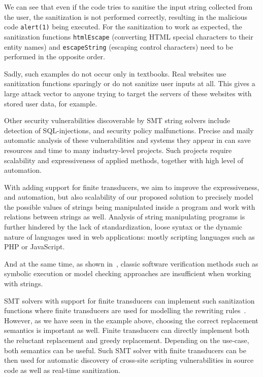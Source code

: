 We can see that even if the code tries to sanitise the input string collected from the user, the sanitization is not performed correctly, resulting in the malicious code \texttt{alert(1)} being executed.
For the sanitization to work as expected, the sanitization functions \texttt{htmlEscape} (converting HTML special characters to their entity names) and \texttt{escapeString} (escaping control characters) need to be performed in the opposite order.

Sadly, such examples do not occur only in textbooks. Real websites use sanitization functions sparingly or do not sanitize user inputs at all.
This gives a large attack vector to anyone trying to target the servers of these websites with stored user data, for example.

Other security vulnerabilities discoverable by SMT string solvers include detection of SQL-injections, and security policy malfunctions.
Precise and maily automatic analysis of these vulnerabilities and systems they appear in can save resources and time to many industry-level projects.
Such projects require scalability and expressiveness of applied methods, together with high level of automation.

With adding support for finite transducers, we aim to improve the expressiveness, and automation, but also scalability of our proposed solution to precisely model the possible values of strings being manipulated inside a program and work with relations between strings as well.
Analysis of string manipulating programs is further hindered by the lack of standardization, loose syntax or the dynamic nature of languages used in web applications: mostly scripting languages such as PHP or JavaScript.

And at the same time, as shown in~\cite{analjschallenges17}, classic software verification methods such as symbolic execution or model checking approaches are insufficient when working with strings.

SMT solvers with support for finite transducers can implement such sanitization functions where finite transducers are used for modelling the rewriting rules~\cite{rewriting_rules_kaplan94, rewriting_rules_karttunen97}.
However, as we have seen in the example above, choosing the correct replacement semantics is important as well.
Finite transducers can directly implement both the reluctant replacement and greedy replacement.
Depending on the use-case, both semantics can be useful.
Such SMT solver with finite transducers can be then used for automatic discovery of cross-site scripting vulnerabilities in source code as well as real-time sanitization.

